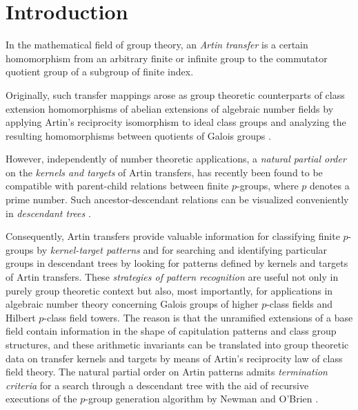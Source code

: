 \documentclass{amsart}
\theoremstyle{definition}
\numberwithin{equation}{section}
\begin{document}
\maketitle



\section{Introduction}
\label{s:Intro}
In the mathematical field of group theory,
an \textit{Artin transfer} is a certain homomorphism from an arbitrary finite or infinite group
to the commutator quotient group of a subgroup of finite index.

Originally, such transfer mappings arose as group theoretic counterparts of
class extension homomorphisms of abelian extensions of algebraic number fields
by applying Artin's reciprocity isomorphism
\cite[\S 4, Allgemeines Reziprozit\"atsgesetz, p.361]{Ar1}
to ideal class groups and
analyzing the resulting homomorphisms between quotients of Galois groups
\cite[\S 2, p.50]{Ar2}.

However, independently of number theoretic applications,
a \textit{natural partial order} on the \textit{kernels and targets} of Artin transfers,
has recently been found
to be compatible with parent-child relations between finite \(p\)-groups,
where \(p\) denotes a prime number.
Such ancestor-descendant relations can be visualized conveniently in \textit{descendant trees}
\cite[\S 4, pp.163--164]{Ma5}.

Consequently, Artin transfers provide valuable information
for classifying finite \(p\)-groups by \textit{kernel-target patterns}
and for searching and identifying particular groups in descendant trees
by looking for patterns defined by kernels and targets of Artin transfers.
These \textit{strategies of pattern recognition}
are useful not only in purely group theoretic context
but also, most importantly, for applications in algebraic number theory
concerning Galois groups of higher \(p\)-class fields and Hilbert \(p\)-class field towers.
The reason is that the unramified extensions of a base field
contain information in the shape of capitulation patterns and class group structures,
and these arithmetic invariants can be translated into
group theoretic data on transfer kernels and targets
by means of Artin's reciprocity law of class field theory.
The natural partial order on Artin patterns
admits \textit{termination criteria} for a search through a descendant tree
with the aid of recursive executions of the \(p\)-group generation algorithm
by Newman
\cite{Nm}
and O'Brien
\cite{Ob}.
\end{document}
